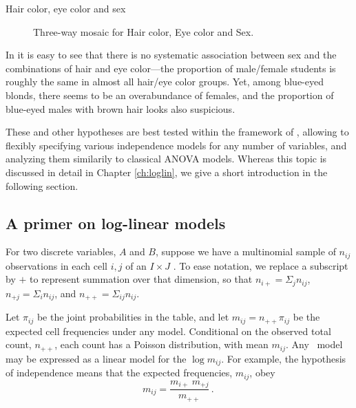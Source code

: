 \documentclass[10pt,krantz2]{krantz}\usepackage[]{graphicx}\usepackage[]{color}
\newenvironment{knitrout}{}{} %
\renewenvironment{knitrout}{\small\renewcommand{\baselinestretch}{.85}}{} %
\begin{document}
\begin{Example}[HEC1]{Hair color, eye color and sex}
\begin{knitrout}
\begin{figure}[!htb]
\caption[Three-way mosaic for Hair color, Eye color and Sex]{Three-way mosaic for Hair color, Eye color and Sex.}\label{fig:HEC-mos1b}
\end{figure}


\end{knitrout}
In  it is easy to
see that there is no systematic association between sex
and the combinations of hair and eye color---the proportion of
male/female students is roughly the same in almost all hair/eye color
groups. Yet, among blue-eyed blonds, there seems to be an
overabundance of females, and the proportion of blue-eyed males
with brown hair looks also suspicious.
\end{Example}
These and other hypotheses are best tested within the framework 
of , allowing to flexibly specifying
various independence models for any number of variables,
and analyzing them similarily to classical
ANOVA models. Whereas this topic is discussed in detail
in Chapter \ref{ch:loglin}, we give a short introduction in the following section.

\subsection{A primer on log-linear models}\label{sec:loglinprimer}

For two discrete variables, $A$ and $B$, suppose we have a multinomial sample of $n_{ij}$ observations in each cell $i,j$ of an $I \times J$
\ctab.   To ease notation, we replace a subscript by $+$ to represent
summation over that dimension, so that $n_{i+} = \Sigma_j n_{ij}$,
$n_{+j} = \Sigma_i n_{ij}$, and $n_{++} = \Sigma_{ij} n_{ij}$.

Let $\pi_{ij}$ be the joint probabilities in the table, and let
$m_{ij} = n_{++} \pi_{ij}$ be the expected cell frequencies under
any model.
Conditional on the observed total count, $n_{++}$,
each count has a Poisson distribution, with mean $m_{ij}$.
Any \loglin\ model may be expressed as a linear model for the $\log m_{ij}$.
For
example, the hypothesis of independence means that the expected
frequencies, \(m_{ij}\), obey
\begin{equation*}%
  m_{ij} = \frac{ m_{i+} \:  m_{+j} } {m_{++}}
  \period
\end{equation*}
\end{document}
